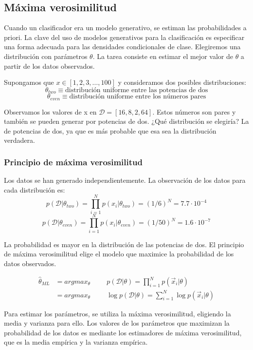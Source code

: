 \subsection{Máxima verosimilitud}
Cuando un clasificador era un modelo generativo, se estiman las probabilidades a priori. La clave del uso de modelos generativos para la clasificación es especificar una forma adecuada para las densidades condicionales de clase. Elegiremos una distribución con parámetros $\theta$. La tarea consiste en estimar el mejor valor de $\theta$ a partir de los datos observados.

Supongamos que $x \in [1, 2, 3, \ldots, 100]$ y consideramos dos posibles distribuciones:
$$\theta_{two} \equiv \text{distribución uniforme entre las potencias de dos}$$
$$\theta_{even} \equiv \text{distribución uniforme entre los números pares}$$

Observamos los valores de x en $\mathcal{D} = [16, 8, 2, 64]$. Estos números son pares y también se pueden generar por potencias de dos. ¿Qué distribución se elegiría? La de potencias de dos, ya que es más probable que esa sea la distribución verdadera.

\subsubsection{Principio de máxima verosimilitud}
Los datos se han generado independientemente. La observación de los datos para cada distribución es:
$$p(\mathcal{D}|\theta_{two}) = \prod_{i=1}^N p(x_i | \theta_{two}) = (1/6)^N = 7.7 \cdot 10^{-4}$$
$$p(\mathcal{D}|\theta_{even}) = \prod_{i=1}^N p(x_i | \theta_{even}) = (1/50)^N = 1.6 \cdot 10^{-7}$$

La probabilidad es mayor en la distribución de las potencias de dos. 
El principio de máxima verosimilitud elige el modelo que maximice la probabilidad de los datos observados.

\begin{align*}
\hat{\theta}_{ML} &= arg max_{\theta}  \hspace{1cm} p(\mathcal{D} | \theta) = \prod^N_{i=1} p(\vec{x}_i|\theta) \\
&= arg max_{\theta} \hspace{1cm} \log p(\mathcal{D} | \theta) = \sum^N_{i=1} \log p(\vec{x}_i|\theta)
\end{align*}

Para estimar los parámetros, se utiliza la máxima verosimilitud, eligiendo la media y varianza para ello. Los valores de los parámetros que maximizan la probabilidad de los datos es mediante los estimadores de máxima verosimilitud, que es la media empírica y la varianza empírica.

